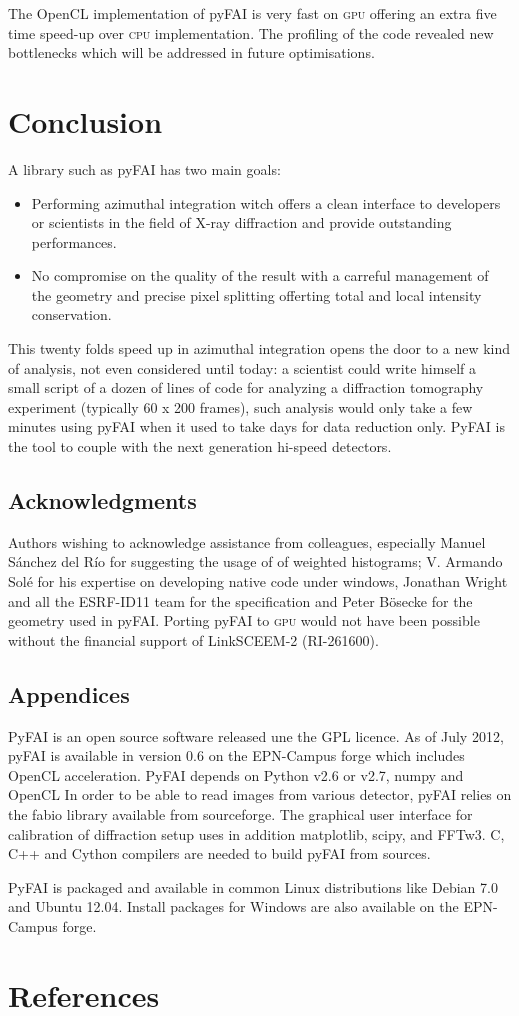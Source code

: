 \documentclass[a4paper]{jpconf}
\begin{document}
The OpenCL implementation of pyFAI is very fast on \textsc{gpu} offering an extra five
time speed-up over \textsc{cpu} implementation. The profiling of the code revealed new
bottlenecks which will be addressed in future optimisations.

\section{Conclusion}


A library such as pyFAI has two main goals:
\begin{itemize}
\item Performing azimuthal integration witch offers a clean interface to
developers or scientists in the field of X-ray diffraction and provide outstanding performances.
\item No compromise on the quality of the result with a carreful management of
the geometry and precise pixel splitting offerting total and local intensity
conservation.
\end{itemize}

This twenty folds speed up in azimuthal integration opens the door to a new
kind of analysis, not even considered until today: a scientist could write
himself a small script of a dozen of lines of code for analyzing a diffraction
tomography experiment (typically 60 x 200 frames), such analysis would only
take a few minutes using pyFAI when it used to take days for data reduction only.
PyFAI is the tool to couple with the next generation hi-speed detectors.

\subsection*{Acknowledgments}
Authors wishing to acknowledge assistance from
colleagues, especially Manuel S\'anchez del R\'io for suggesting the usage of
of weighted histograms;
V. Armando Sol\'e for his expertise on developing native code under windows,
Jonathan Wright and all the ESRF-ID11 team for the specification and Peter B\"osecke for
the geometry used in pyFAI. Porting pyFAI to \textsc{gpu} would not have been
possible without the financial support of LinkSCEEM-2 (RI-261600).

\subsection*{Appendices}
PyFAI is an open source software released une the GPL licence.
As of July 2012, pyFAI is available in version 0.6 on the EPN-Campus
forge\cite{forge} which includes OpenCL acceleration.
PyFAI depends on Python v2.6 or v2.7, numpy\cite{numpy} and OpenCL\cite{opencl}
In order to be able to read images from various detector, pyFAI relies on the
fabio\cite{fabio} library available from sourceforge. The graphical user
interface for calibration of diffraction setup uses in addition
matplotlib\cite{matplotlib}, scipy\cite{scipy}, and FFTw3\cite{fftw}.
C, C++ and Cython\cite{cython} compilers are needed to build pyFAI from sources.

PyFAI is packaged and available in common Linux distributions like Debian
7.0 and Ubuntu 12.04. Install packages for Windows are also
available on the EPN-Campus forge.

 \section*{References}


\end{document}
